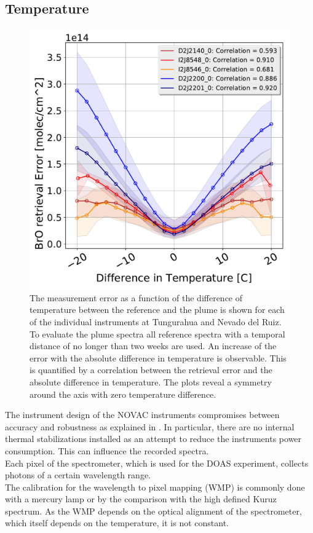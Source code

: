 \subsection{Temperature}
\begin{figure}
	\centering
	\includegraphics[width=0.7\linewidth]{Bilder/DiffTempallInstruments}
	\caption{The  measurement error as a function of the difference of temperature between the reference and the plume is shown for each of the individual instruments at Tungurahua and Nevado del Ruiz. To evaluate the plume spectra all reference spectra with a temporal distance of no longer than two weeks are used. An increase of the  error with the absolute difference in temperature is observable. This is quantified by a correlation between the  retrieval error and the absolute difference in temperature. The plots reveal a symmetry around the axis with zero temperature difference.}
	\label{fig:difftemp}
\end{figure}
The instrument design of the NOVAC instruments compromises between accuracy and robustness as explained in . In particular, there are no internal thermal stabilizations installed as an attempt to reduce the instruments power consumption. This can influence the recorded spectra.\\	
Each pixel of the spectrometer, which is used for the DOAS experiment, collects photons of a certain wavelength range.\\
The calibration for the wavelength to pixel mapping (WMP) is commonly done with a mercury lamp or by the comparison with the high defined Kuruz spectrum.
As the WMP depends on the optical alignment of the spectrometer, which itself depends on the temperature, it is not constant.
